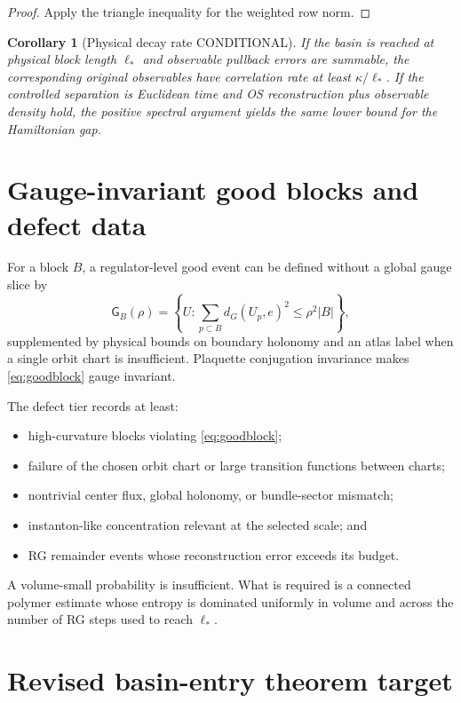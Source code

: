 \documentclass[11pt]{article}
\newcommand{\Cstatus}{\textcolor{conditional}{\textsf{CONDITIONAL}}}
\newtheorem{corollary}[definition]{Corollary}
\theoremstyle{remark}
\begin{document}
\begin{proof}
Apply the triangle inequality for the weighted row norm.
\end{proof}

\begin{corollary}[Physical decay rate \Cstatus]
If the basin is reached at physical block length $\ell_*$ and observable
pullback errors are summable, the corresponding original observables have
correlation rate at least $\kappa/\ell_*$.  If the controlled separation is
Euclidean time and OS reconstruction plus observable density hold, the
positive spectral argument yields the same lower bound for the Hamiltonian
gap.
\end{corollary}

\section{Gauge-invariant good blocks and defect data}

For a block $B$, a regulator-level good event can be defined without a global
gauge slice by
\begin{equation}\label{eq:goodblock}
 \mathsf G_B(\rho)
 =\left\{U:\sum_{p\subset B}
 d_G(U_p,e)^2\le\rho^2|B|\right\},
\end{equation}
supplemented by physical bounds on boundary holonomy and an atlas label when a
single orbit chart is insufficient.  Plaquette conjugation invariance makes
\eqref{eq:goodblock} gauge invariant.

The defect tier records at least:
\begin{itemize}
\item high-curvature blocks violating \eqref{eq:goodblock};
\item failure of the chosen orbit chart or large transition functions between
      charts;
\item nontrivial center flux, global holonomy, or bundle-sector mismatch;
\item instanton-like concentration relevant at the selected scale; and
\item RG remainder events whose reconstruction error exceeds its budget.
\end{itemize}

A volume-small probability is insufficient.  What is required is a connected
polymer estimate whose entropy is dominated uniformly in volume and across the
number of RG steps used to reach $\ell_*$.

\section{Revised basin-entry theorem target}
\end{document}
